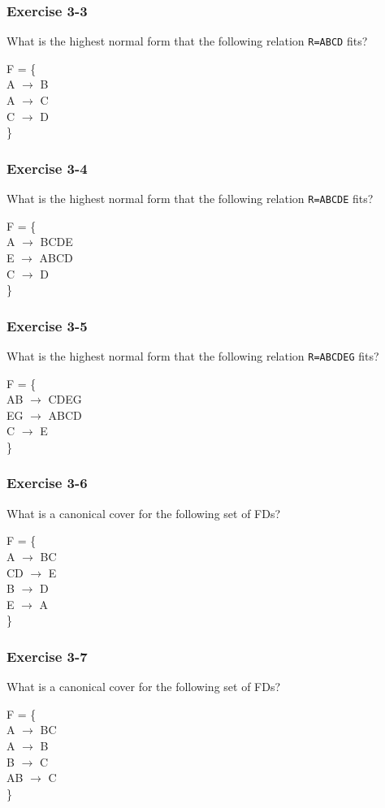 \begin{frame}
\frametitle{Exercise 3-3}

What is the highest normal form that the following relation \texttt{R=ABCD} fits?

F = \{ \\
A $\rightarrow$ B \\
A $\rightarrow$ C \\
C $\rightarrow$ D \\
\} \\

\end{frame}


\begin{frame}
\frametitle{Exercise 3-4}

What is the highest normal form that the following relation \texttt{R=ABCDE} fits?

F = \{ \\
A $\rightarrow$ BCDE \\
E $\rightarrow$ ABCD \\
C $\rightarrow$ D \\
\}

\end{frame}


\begin{frame}
\frametitle{Exercise 3-5}

What is the highest normal form that the following relation \texttt{R=ABCDEG} fits?

F = \{ \\
AB $\rightarrow$ CDEG \\
EG $\rightarrow$ ABCD \\
C $\rightarrow$ E \\
\}

\end{frame}


\begin{frame}
\frametitle{Exercise 3-6}

What is a canonical cover for the following set of FDs?

F = \{ \\
  A $\rightarrow$ BC\\
  CD $\rightarrow$ E\\
  B $\rightarrow$ D\\
  E $\rightarrow$ A\\
\}

\end{frame}


\begin{frame}
\frametitle{Exercise 3-7}

What is a canonical cover for the following set of FDs?

F = \{ \\
  A $\rightarrow$ BC\\
  A $\rightarrow$ B\\
  B $\rightarrow$ C\\
  AB $\rightarrow$ C\\
\}

\end{frame}


